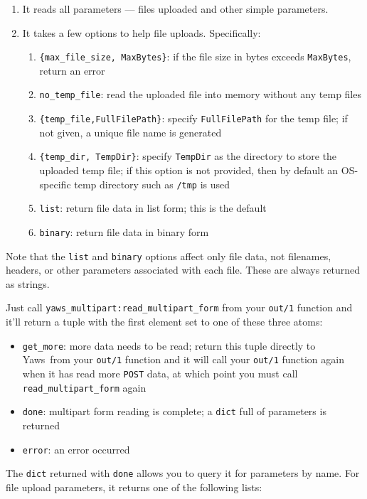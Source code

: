\documentclass[11pt,oneside,english]{book}
\newcommand{\Yaws}            %
        {{\sc Yaws}}
\begin{document}
\begin{enumerate}
\item It reads all parameters --- files uploaded and other simple
  parameters.
\item It takes a few options to help file uploads. Specifically:
\begin{enumerate}
\item \verb+{max_file_size, MaxBytes}+: if the file size in bytes
  exceeds \verb+MaxBytes+, return an error
\item \verb+no_temp_file+: read the uploaded file into memory without
  any temp files
\item \verb+{temp_file,FullFilePath}+: specify \verb+FullFilePath+ for
  the temp file; if not given, a unique file name is generated
\item \verb+{temp_dir, TempDir}+: specify \verb+TempDir+ as the
  directory to store the uploaded temp file; if this option is not
  provided, then by default an OS-specific temp directory such as
  \verb+/tmp+ is used
\item \verb+list+: return file data in list form; this is the default
\item \verb+binary+: return file data in binary form
\end{enumerate}
\end{enumerate}

Note that the \verb+list+ and \verb+binary+ options affect only file
data, not filenames, headers, or other parameters associated with each
file. These are always returned as strings.

Just call \verb+yaws_multipart:read_multipart_form+ from your
\verb+out/1+ function and it'll return a tuple with the first element
set to one of these three atoms:

\begin{itemize}
\item \verb+get_more+: more data needs to be read; return this tuple
  directly to \Yaws\ from your \verb+out/1+ function and it will call
  your \verb+out/1+ function again when it has read more \verb+POST+
  data, at which point you must call \verb+read_multipart_form+ again
\item \verb+done+: multipart form reading is complete; a
  \verb+dict+ full of parameters is returned
\item \verb+error+: an error occurred
\end{itemize}

The \verb+dict+ returned with \verb+done+ allows you to query it for
parameters by name. For file upload parameters, it returns one of the
following lists:
\end{document}
